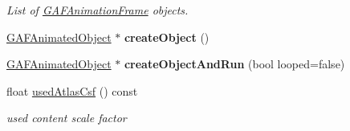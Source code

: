 \begin{DoxyCompactItemize}
\begin{DoxyCompactList}\small\item\em List of \hyperlink{class_g_a_f_1_1_g_a_f_animation_frame}{G\-A\-F\-Animation\-Frame} objects. \end{DoxyCompactList}\item 
\hypertarget{class_g_a_f_1_1_g_a_f_asset_a675440c329d07af3dd70e52316ddaea5}{\hyperlink{class_g_a_f_1_1_g_a_f_animated_object}{G\-A\-F\-Animated\-Object} $\ast$ {\bfseries create\-Object} ()}\label{class_g_a_f_1_1_g_a_f_asset_a675440c329d07af3dd70e52316ddaea5}

\item 
\hypertarget{class_g_a_f_1_1_g_a_f_asset_a1b8286f43e4d5bb4f6b19d5d97965098}{\hyperlink{class_g_a_f_1_1_g_a_f_animated_object}{G\-A\-F\-Animated\-Object} $\ast$ {\bfseries create\-Object\-And\-Run} (bool looped=false)}\label{class_g_a_f_1_1_g_a_f_asset_a1b8286f43e4d5bb4f6b19d5d97965098}

\item 
\hypertarget{class_g_a_f_1_1_g_a_f_asset_a1016caada738c542caaea76baa415439}{float \hyperlink{class_g_a_f_1_1_g_a_f_asset_a1016caada738c542caaea76baa415439}{used\-Atlas\-Csf} () const }\label{class_g_a_f_1_1_g_a_f_asset_a1016caada738c542caaea76baa415439}

\begin{DoxyCompactList}\small\item\em used content scale factor \end{DoxyCompactList}\end{DoxyCompactItemize}

